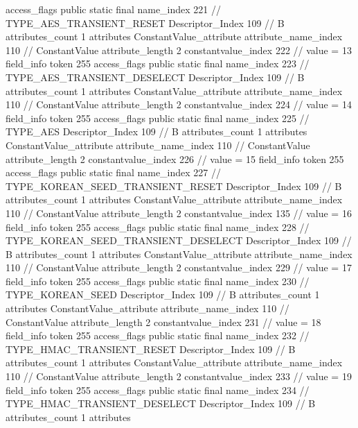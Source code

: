 {{{{{				access_flags	public static final
				name_index	221		// TYPE_AES_TRANSIENT_RESET
				Descriptor_Index	109		// B
				attributes_count	1
				attributes {
				ConstantValue_attribute {
					attribute_name_index	110		// ConstantValue
					attribute_length	2
					constantvalue_index	222		// value = 13
				}
				}
			}
			field_info {
				token	255
				access_flags	public static final
				name_index	223		// TYPE_AES_TRANSIENT_DESELECT
				Descriptor_Index	109		// B
				attributes_count	1
				attributes {
				ConstantValue_attribute {
					attribute_name_index	110		// ConstantValue
					attribute_length	2
					constantvalue_index	224		// value = 14
				}
				}
			}
			field_info {
				token	255
				access_flags	public static final
				name_index	225		// TYPE_AES
				Descriptor_Index	109		// B
				attributes_count	1
				attributes {
				ConstantValue_attribute {
					attribute_name_index	110		// ConstantValue
					attribute_length	2
					constantvalue_index	226		// value = 15
				}
				}
			}
			field_info {
				token	255
				access_flags	public static final
				name_index	227		// TYPE_KOREAN_SEED_TRANSIENT_RESET
				Descriptor_Index	109		// B
				attributes_count	1
				attributes {
				ConstantValue_attribute {
					attribute_name_index	110		// ConstantValue
					attribute_length	2
					constantvalue_index	135		// value = 16
				}
				}
			}
			field_info {
				token	255
				access_flags	public static final
				name_index	228		// TYPE_KOREAN_SEED_TRANSIENT_DESELECT
				Descriptor_Index	109		// B
				attributes_count	1
				attributes {
				ConstantValue_attribute {
					attribute_name_index	110		// ConstantValue
					attribute_length	2
					constantvalue_index	229		// value = 17
				}
				}
			}
			field_info {
				token	255
				access_flags	public static final
				name_index	230		// TYPE_KOREAN_SEED
				Descriptor_Index	109		// B
				attributes_count	1
				attributes {
				ConstantValue_attribute {
					attribute_name_index	110		// ConstantValue
					attribute_length	2
					constantvalue_index	231		// value = 18
				}
				}
			}
			field_info {
				token	255
				access_flags	public static final
				name_index	232		// TYPE_HMAC_TRANSIENT_RESET
				Descriptor_Index	109		// B
				attributes_count	1
				attributes {
				ConstantValue_attribute {
					attribute_name_index	110		// ConstantValue
					attribute_length	2
					constantvalue_index	233		// value = 19
				}
				}
			}
			field_info {
				token	255
				access_flags	public static final
				name_index	234		// TYPE_HMAC_TRANSIENT_DESELECT
				Descriptor_Index	109		// B
				attributes_count	1
				attributes {
}}}}}}
